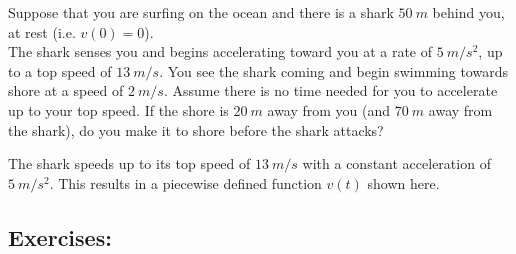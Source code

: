 Suppose that you are surfing on the ocean and there is a shark $\SI{50}{m}$ behind you, at rest (i.e. $v(0)=0$). \\

The shark senses you and begins accelerating toward you at a rate of $\SI{5}{m/s^2}$, up to a top speed of $\SI{13}{m/s}$.
You see the shark coming and begin swimming towards shore at a speed of $\SI{2}{m/s}$. Assume there is no time needed for you to accelerate up to your top speed. If the shore is $\SI{20}{m}$ away from you (and $\SI{70}{m}$ away from the shark), do you make it to shore before the shark attacks?

\begin{marginfigure}[-2cm]
\centering
{}
\caption{The shark speeds up to its top speed of $\SI{13}{m/s}$ with a constant acceleration of $\SI{5}{m/s^2}$. This results in a piecewise defined function $v(t)$ shown here.}
\label{fig:sharkvelocity}
\end{marginfigure}

\subsection*{Exercises:}

